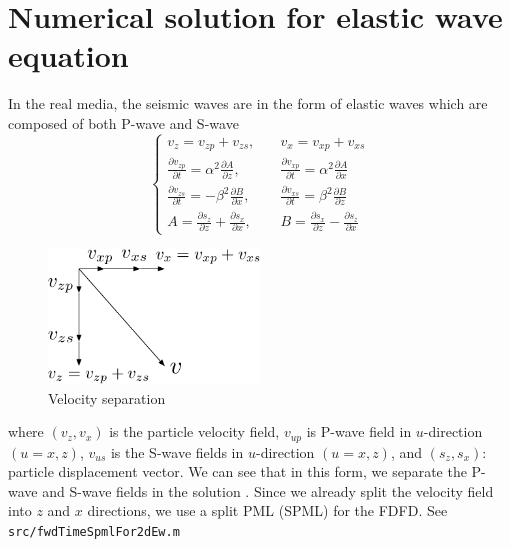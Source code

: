 \documentclass[12pt]{article}
\theoremstyle{plain}
\theoremstyle{definition}
\theoremstyle{remark}
\numberwithin{equation}{section}
\begin{document}
\section{Numerical solution for elastic wave equation}
In the real media, the seismic waves are in the form of elastic waves which are composed of both P-wave and S-wave
\begin{equation}
    \left\{
    \begin{aligned}
    v_z=v_{zp}+v_{zs}, \quad &v_x=v_{xp}+v_{xs}\\
    \frac{\partial v_{zp}}{\partial t}=\alpha^2 \frac{\partial A}{\partial z}, \quad &\frac{\partial v_{xp}}{\partial t}=\alpha^2 \frac{\partial A}{\partial x}\\
    \frac{\partial v_{zs}}{\partial t}=-\beta^2 \frac{\partial B}{\partial x}, \quad &\frac{\partial v_{xs}}{\partial t}=\beta^2 \frac{\partial B}{\partial z}\\
    A=\frac{\partial s_z}{\partial z}+\frac{\partial s_x}{\partial x}, \quad &B=\frac{\partial s_x}{\partial z}-\frac{\partial s_z}{\partial x}
    \end{aligned}
    \right.
    \end{equation}
    \begin{figure}
    \centering
    \includegraphics[width=0.5\textwidth]{Fig/EWCoordinates.pdf}
    \caption{Velocity separation}
    \end{figure}
where $(v_z, v_x)$ is the particle velocity field, $v_{up}$ is P-wave field in $u$-direction $(u=x, z)$,
  $v_{us}$ is the S-wave fields in $u$-direction $(u=x, z)$, and $(s_z, s_x)$: particle displacement vector.
  We can see that in this form, we separate the P-wave and S-wave fields in the solution \cite{Che2014}. Since 
  we already split the velocity field into $z$ and $x$ directions, we use a split PML (SPML) for the FDFD. See \texttt{src/fwdTimeSpmlFor2dEw.m}
\end{document}
